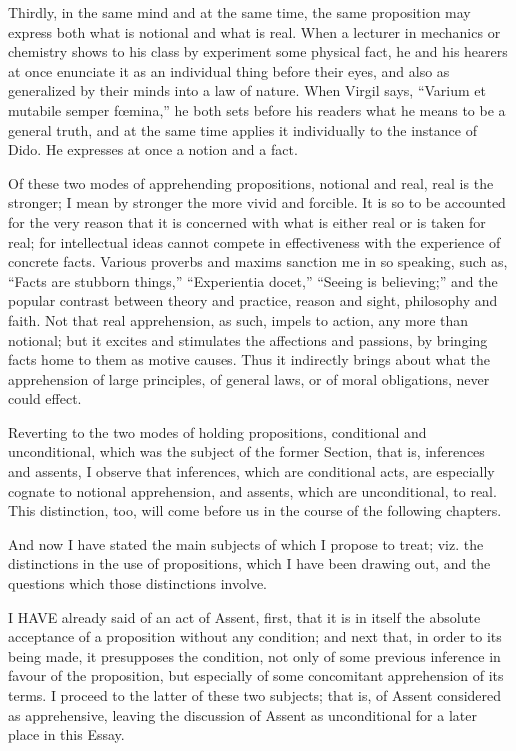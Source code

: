 Thirdly, in the same mind and at the same time, the same
proposition may express both what is notional and what is real. When a
lecturer in mechanics or chemistry shows to his class by experiment
some physical fact, he and his hearers at once enunciate it as an
individual thing before their eyes, and also as generalized by their
minds into a law of nature. When Virgil says, ``Varium et mutabile
semper fœmina,'' he both sets before his readers what he means to
be a general truth, and at the same time applies it individually to
the instance of Dido. He expresses at once a notion and a fact.

Of these two modes of apprehending propositions, notional and real,
real is the stronger; I mean by stronger the more vivid and forcible.
It is so to be accounted for the very reason that it is concerned with
what is either real or is taken for real; for intellectual ideas
cannot compete in effectiveness with the experience of concrete facts.
Various proverbs and maxims sanction me in so speaking, such as,
``Facts are stubborn things,'' ``Experientia docet,''
``Seeing is believing;'' and the popular contrast between
theory and practice, reason and sight, philosophy and faith. Not that
real apprehension, as such, impels to action, any more than notional;
but it excites and stimulates the affections and passions, by bringing
facts home to them as motive causes. Thus it indirectly brings about
what the apprehension of large principles, of general laws, or of
moral obligations, never could effect.

Reverting to the two modes of holding propositions, conditional and
unconditional, which was the subject of the former Section, that is,
inferences and assents, I observe that inferences, which are
conditional acts, are especially cognate to notional apprehension, and
assents, which are unconditional, to real. This distinction, too, will
come before us in the course of the following chapters.

And now I have stated the main subjects of which I propose to
treat; viz. the distinctions in the use of propositions, which I have
been drawing out, and the questions which those distinctions involve.


I HAVE already said of an act of Assent, first, that it is in
itself the absolute acceptance of a proposition without any condition;
and next that, in order to its being made, it presupposes the
condition, not only of some previous inference in favour of the
proposition, but especially of some concomitant apprehension of its
terms. I proceed to the latter of these two subjects; that is, of
Assent considered as apprehensive, leaving the discussion of Assent as
unconditional for a later place in this Essay.


